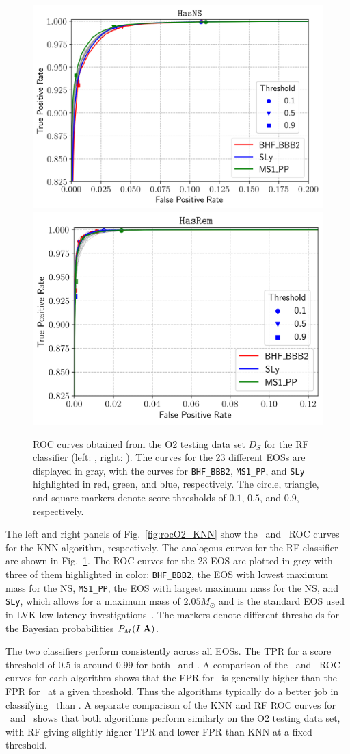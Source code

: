 \begin{figure}[h]
\includegraphics[width=0.45\linewidth]{roc_testing_RF_NS}
\includegraphics[width=0.45\linewidth]{roc_testing_RF_REM}
\caption{\ac{ROC} curves obtained from the \ac{O2} testing data set $D_S$ for the \ac{RF} classifier (left: \hasns, right: \hasrem). The curves for the 23 different \ac{EOS}s are displayed in
gray, with the curves for {\tt BHF\_BBB2}, {\tt MS1\_PP}, and {\tt SLy} highlighted in red, green, and blue, respectively. The circle, triangle, and square markers denote score thresholds of
$0.1$, $0.5$, and $0.9$, respectively.}
\label{fig:rocO2_RF}
\end{figure}

The left and right panels of Fig.~\ref{fig:rocO2_KNN} show the \hasns\ and \hasrem\ \ac{ROC} curves for the \ac{KNN} algorithm, respectively. The analogous curves for the \ac{RF}
classifier are shown in Fig.~\ref{fig:rocO2_RF}. The \ac{ROC} curves for the 23 \ac{EOS} are plotted in grey with three of them highlighted in color: {\tt BHF\_BBB2}, the \ac{EOS}
with lowest maximum mass for the NS, {\tt MS1\_PP}, the \ac{EOS} with largest maximum mass for the \ac{NS}, and {\tt SLy}, which allows for a maximum mass of $2.05 M_\odot$ and is
the standard \ac{EOS} used in \ac{LVK} low-latency investigations~\cite{Ghosh:2021eqv}. The markers denote different thresholds for the Bayesian probabilities $P_M(I|{\bf A})$. 


The two classifiers perform consistently across all \ac{EOS}s. The \ac{TPR} for a score threshold of $0.5$ is around $0.99$ for both \hasns\ and \hasrem. A comparison of the
\hasns\ and \hasrem\ \ac{ROC} curves for each algorithm shows that the \ac{FPR} for \hasns\ is generally higher than the \ac{FPR} for \hasrem\ at a given threshold. Thus the algorithms
typically do a better job in classifying \hasrem\ than \hasns. A separate comparison of the \ac{KNN} and \ac{RF} \ac{ROC} curves for \hasns\ and \hasrem\ shows that both algorithms perform
similarly on the O2 testing data set, with \ac{RF} giving slightly higher \ac{TPR} and lower \ac{FPR} than \ac{KNN} at a fixed threshold. 

